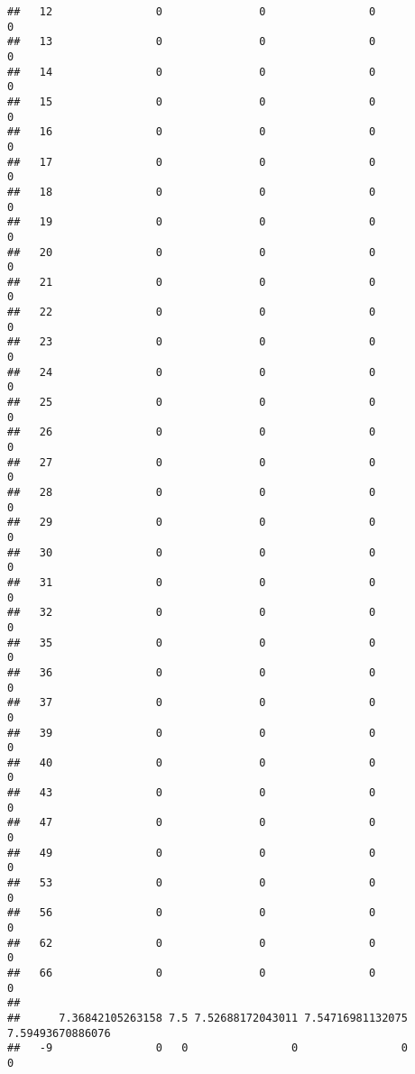 \documentclass[]{article}
\begin{document}
\begin{verbatim}
##   12                0               0                0                0
##   13                0               0                0                0
##   14                0               0                0                0
##   15                0               0                0                0
##   16                0               0                0                0
##   17                0               0                0                0
##   18                0               0                0                0
##   19                0               0                0                0
##   20                0               0                0                0
##   21                0               0                0                0
##   22                0               0                0                0
##   23                0               0                0                0
##   24                0               0                0                0
##   25                0               0                0                0
##   26                0               0                0                0
##   27                0               0                0                0
##   28                0               0                0                0
##   29                0               0                0                0
##   30                0               0                0                0
##   31                0               0                0                0
##   32                0               0                0                0
##   35                0               0                0                0
##   36                0               0                0                0
##   37                0               0                0                0
##   39                0               0                0                0
##   40                0               0                0                0
##   43                0               0                0                0
##   47                0               0                0                0
##   49                0               0                0                0
##   53                0               0                0                0
##   56                0               0                0                0
##   62                0               0                0                0
##   66                0               0                0                0
##     
##      7.36842105263158 7.5 7.52688172043011 7.54716981132075 7.59493670886076
##   -9                0   0                0                0                0

\end{verbatim}
\end{document}
